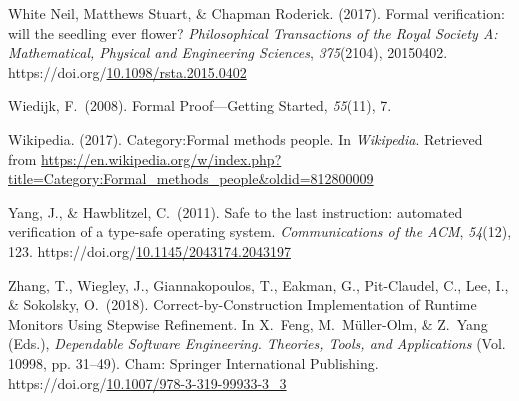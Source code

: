 \documentclass[12pt,twoside]{article}
\begin{document}
{\begin{thebibliography}{222}
\mdbibitemlabel{}White Neil, Matthews Stuart, \& Chapman Roderick. (2017). Formal verification: will the seedling ever flower? \emph{Philosophical Transactions of the Royal Society A: Mathematical, Physical and Engineering Sciences}, \emph{375}(2104), 20150402. https://doi.org/\href{https://dx.doi.org/10.1098/rsta.2015.0402}{10.1098/rsta.2015.0402}\label{white_neil_formal_2017}%

\mdbibitemlabel{}Wiedijk, F.~(2008). Formal Proof—Getting Started, \emph{55}(11), 7.\label{wiedijk_formal_2008}%

\mdbibitemlabel{}Wikipedia. (2017). Category:Formal methods people. In \emph{Wikipedia}. Retrieved from \href{https://en.wikipedia.org/w/index.php?title=Category:Formal_methods_people\%26oldid=812800009}{{\ttfamily https://\hspace{0pt}en.\hspace{0pt}wikipedia.\hspace{0pt}org/\hspace{0pt}w/\hspace{0pt}index.\hspace{0pt}php?\hspace{0pt}title=\hspace{0pt}Category:Formal\_\hspace{0pt}methods\_\hspace{0pt}people\&\hspace{0pt}oldid=\hspace{0pt}812800009}}\label{wikipedia_category:formal_2017}%

\mdbibitemlabel{}Yang, J., \& Hawblitzel, C.~(2011). Safe to the last instruction: automated verification of a type-safe operating system. \emph{Communications of the ACM}, \emph{54}(12), 123. https://doi.org/\href{https://dx.doi.org/10.1145/2043174.2043197}{10.1145/2043174.2043197}\label{yang_safe_2011}%

\mdbibitemlabel{}Zhang, T., Wiegley, J., Giannakopoulos, T., Eakman, G., Pit-Claudel, C., Lee, I., \& Sokolsky, O.~(2018). Correct-by-Construction Implementation of Runtime Monitors Using Stepwise Refinement. In X.~Feng, M.~Müller-Olm, \& Z.~Yang (Eds.), \emph{Dependable Software Engineering. Theories, Tools, and Applications} (Vol. 10998, pp. 31–49). Cham: Springer International Publishing. https://doi.org/\href{https://dx.doi.org/10.1007/978-3-319-99933-3_3}{10.1007/978-3-319-99933-3\_3}\label{feng_correct-by-construction_2018}%


\end{thebibliography}}
\end{document}
